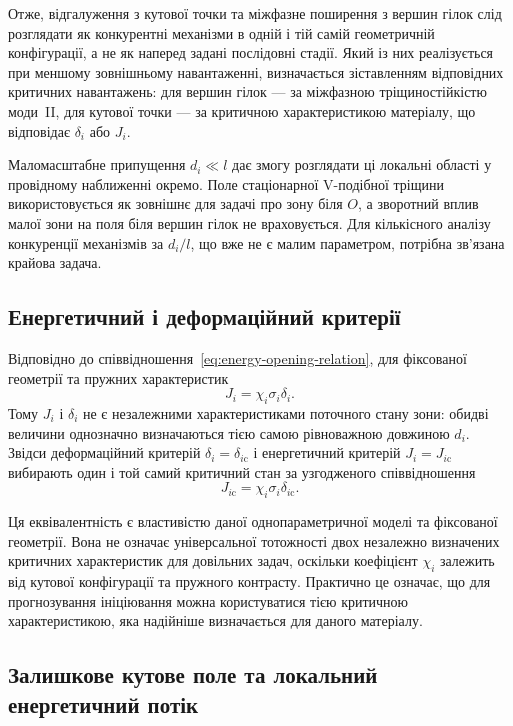 Отже, відгалуження з кутової точки та міжфазне поширення з вершин
гілок слід розглядати як конкурентні механізми в одній і тій самій
геометричній конфігурації, а не як наперед задані послідовні стадії.
Який із них реалізується при меншому зовнішньому навантаженні,
визначається зіставленням відповідних критичних навантажень: для
вершин гілок --- за міжфазною тріщиностійкістю моди~II, для кутової
точки --- за критичною характеристикою матеріалу, що відповідає
$\delta_i$ або $J_i$.

Маломасштабне припущення $d_i\ll l$ дає змогу розглядати ці локальні
області у провідному наближенні окремо. Поле стаціонарної V-подібної
тріщини використовується як зовнішнє для задачі про зону біля $O$, а
зворотний вплив малої зони на поля біля вершин гілок не
враховується. Для кількісного аналізу конкуренції механізмів за $d_i/l$,
що вже не є малим параметром, потрібна зв'язана крайова задача.

\subsection{Енергетичний і деформаційний критерії}
\label{subsec:discussion-criteria}

Відповідно до співвідношення~\eqref{eq:energy-opening-relation}, для
фіксованої геометрії та пружних характеристик
\begin{equation*}
  J_i=\chi_i\sigma_i\delta_i.
\end{equation*}
Тому $J_i$ і $\delta_i$ не є незалежними характеристиками поточного
стану зони: обидві величини однозначно визначаються тією самою
рівноважною довжиною $d_i$. Звідси деформаційний критерій
$\delta_i=\delta_{i\mathrm{c}}$ і енергетичний критерій
$J_i=J_{i\mathrm{c}}$ вибирають один і той самий критичний стан за
узгодженого співвідношення
\begin{equation*}
  J_{i\mathrm{c}}
  =\chi_i\sigma_i\delta_{i\mathrm{c}}.
\end{equation*}

Ця еквівалентність є властивістю даної однопараметричної моделі та
фіксованої геометрії. Вона не означає універсальної тотожності двох
незалежно визначених критичних характеристик для довільних задач,
оскільки коефіцієнт $\chi_i$ залежить від кутової конфігурації та
пружного контрасту. Практично це означає, що для прогнозування
ініціювання можна користуватися тією критичною характеристикою, яка
надійніше визначається для даного матеріалу.

\subsection{Залишкове кутове поле та локальний енергетичний потік}
\label{subsec:discussion-flux}

